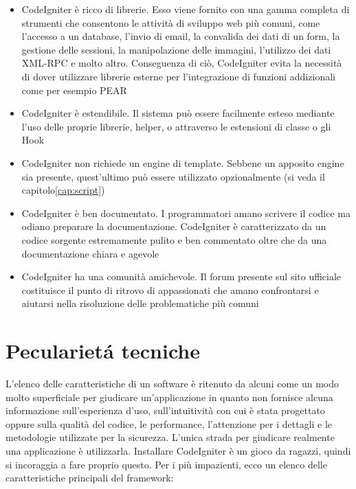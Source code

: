 \begin{itemize}
\item CodeIgniter è ricco di librerie. Esso viene fornito con una gamma completa di strumenti che consentono le attività di sviluppo web più comuni, come l'accesso a un database, l'invio di email, la convalida dei dati di un form, la gestione delle sessioni, la manipolazione delle immagini, l'utilizzo dei dati \ac{XML-RPC} e molto altro. Conseguenza di ciò, CodeIgniter evita la necessità di dover utilizzare librerie esterne per l'integrazione di funzioni addizionali come per esempio \ac{PEAR}
\item CodeIgniter è estendibile. Il sistema può essere facilmente esteso mediante l'uso delle proprie librerie, helper, o attraverso le estensioni di classe o gli Hook
\item CodeIgniter non richiede un engine di template. Sebbene un apposito engine sia presente, quest'ultimo può essere utilizzato opzionalmente (si veda il capitolo\vref{cap:script})
\item CodeIgniter è ben documentato. I programmatori amano scrivere il codice ma odiano preparare la documentazione. CodeIgniter è caratterizzato da un codice sorgente estremamente pulito e ben commentato oltre che da una documentazione chiara e agevole
\item CodeIgniter ha una comunità amichevole. Il forum presente sul sito ufficiale costituisce il punto di ritrovo di appassionati che amano confrontarsi e aiutarsi nella risoluzione delle problematiche più comuni
\end{itemize}

\section*{Peculariet\'a tecniche}
L'elenco delle caratteristiche di un software è ritenuto da alcuni come un modo molto superficiale per giudicare un'applicazione in quanto non fornisce alcuna informazione sull'esperienza d'uso, sull'intuitività con cui è stata progettato oppure sulla qualità del codice, le performance, l'attenzione per i dettagli e le metodologie utilizzate per la sicurezza. L'unica strada per giudicare realmente una applicazione è utilizzarla. Installare CodeIgniter è un gioco da ragazzi, quindi si incoraggia a fare proprio questo. Per i più impazienti, ecco un elenco delle caratteristiche principali del framework:

